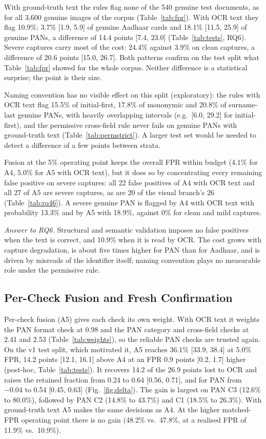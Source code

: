 \documentclass[12pt]{article}
\begin{document}
With ground-truth text the rules flag none of the 540 genuine test
documents, as for all 3{,}600 genuine images of the corpus
(Table~\ref{tab:fpr}).
With OCR text they flag 10.9\%: 3.7\% [1.9, 5.9] of genuine Aadhaar
cards and 18.1\% [11.5, 25.9] of genuine PANs, a difference of 14.4
points [7.4, 23.0] (Table~\ref{tab:tests}, RQ6). Severe captures carry
most of the cost: 24.4\% against 3.9\% on clean captures, a difference
of 20.6 points [15.0, 26.7]. Both patterns confirm on the test split
what Table~\ref{tab:fpr} showed for the whole corpus. Neither
difference is a statistical surprise; the point is their size.

Naming convention has no visible effect on this split (exploratory):
the rules with OCR text flag 15.5\% of initial-first, 17.8\% of
mononymic and 20.8\% of surname-last genuine PANs, with heavily
overlapping intervals (e.g.\ [6.0, 29.2] for initial-first), and the
permissive cross-field rule never fails on genuine PANs with
ground-truth text (Table~\ref{tab:permstrict}). A larger test set would
be needed to detect a difference of a few points between strata.

Fusion at the 5\% operating point keeps the overall FPR within budget
(4.1\% for A4, 5.0\% for A5 with OCR text), but it does so by
concentrating every remaining false positive on severe captures: all
22 false positives of A4 with OCR text and all 27 of A5 are severe
captures, as are 20 of the visual branch's 26 (Table~\ref{tab:rq46}).
A severe genuine PAN is flagged by A4 with OCR text with probability
13.3\% and by A5 with 18.9\%, against 0\% for clean and mild captures.

\emph{Answer to RQ6.} Structural and semantic validation imposes no
false positives when the text is correct, and 10.9\% when it is read by
OCR. The cost grows with capture degradation, is about five times higher
for PAN than for Aadhaar, and is driven by misreads of the identifier
itself; naming convention plays no measurable role under the permissive
rule.

\subsection{Per-Check Fusion and Fresh Confirmation}
\label{subsec:res-a5}

Per-check fusion (A5) gives each check its own weight. With OCR text it
weights the PAN format check at 0.98 and the PAN category and
cross-field checks at 2.41 and 2.53 (Table~\ref{tab:weights}), so the
reliable PAN checks are trusted again. On the v1 test split, which
motivated it, A5 reaches 36.1\% [33.9, 38.4] at 5.0\% FPR, 14.2 points
[12.1, 16.1] above A4 at an FPR 0.9 points [0.2, 1.7] higher (post-hoc,
Table~\ref{tab:tests}). It recovers 14.2 of the 26.9 points lost to OCR
and raises the retained fraction from 0.24 to 0.64 [0.56, 0.71], and
for PAN from $-0.04$ to 0.54 [0.45, 0.63] (Fig.~\ref{fig:delta}). The
gain is largest on PAN C3 (12.6\% to 80.0\%), followed by PAN C2 (14.8\%
to 43.7\%) and C1 (18.5\% to 26.3\%). With ground-truth text A5 makes
the same decisions as A4. At the higher matched-FPR operating point
there is no gain (48.2\% vs.\ 47.8\%, at a realised FPR of 11.9\% vs.\
10.9\%).
\end{document}
